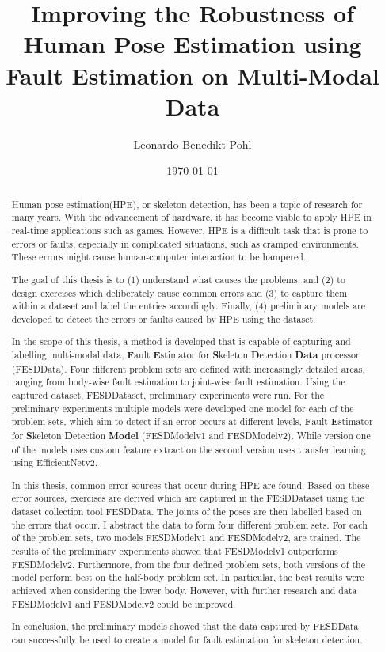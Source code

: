 
\title{Improving the Robustness of Human Pose Estimation using Fault Estimation on Multi-Modal Data}
\author{Leonardo Benedikt Pohl}
\date{\today}
 
\newlength{\originalVOffset}
\newlength{\originalHOffset}
\setlength{\originalVOffset}{\voffset}   
\setlength{\originalHOffset}{\hoffset}

\setlength{\voffset}{0cm}
\setlength{\hoffset}{0cm}

\setlength{\voffset}{\originalVOffset}
\setlength{\hoffset}{\originalHOffset}

\cleardoublepage

\begin{abstract}  
  Human pose estimation(HPE), or skeleton detection, has been a topic of research for many years. With the advancement of hardware, it has become viable to apply HPE in real-time applications such as games. However, HPE is a difficult task that is prone to errors or faults, especially in complicated situations, such as cramped environments. These errors might cause human-computer interaction to be hampered.

  The goal of this thesis is to (1) understand what causes the problems, and (2) to design exercises which deliberately cause common errors and (3) to capture them within a dataset and label the entries accordingly. Finally, (4) preliminary models are developed to detect the errors or faults caused by HPE using the dataset.

  In the scope of this thesis, a method is developed that is capable of capturing and labelling multi-modal data, \textbf{F}ault \textbf{E}stimator for \textbf{S}keleton \textbf{D}etection \textbf{Data} processor (FESDData). Four different problem sets are defined with increasingly detailed areas, ranging from body-wise fault estimation to joint-wise fault estimation. Using the captured dataset, FESDDataset, preliminary experiments were run. For the preliminary experiments multiple models were developed one model for each of the problem sets, which aim to detect if an error occurs at different levels, \textbf{F}ault \textbf{E}stimator for \textbf{S}keleton \textbf{D}etection \textbf{Model} (FESDModelv1 and FESDModelv2). While version one of the models uses custom feature extraction the second version uses transfer learning using EfficientNetv2.

  In this thesis, common error sources that occur during HPE are found. Based on these error sources, exercises are derived which are captured in the FESDDataset using the dataset collection tool FESDData. The joints of the poses are then labelled based on the errors that occur. I abstract the data to form four different problem sets. For each of the problem sets, two models FESDModelv1 and FESDModelv2, are trained. The results of the preliminary experiments showed that FESDModelv1 outperforms FESDModelv2. Furthermore, from the four defined problem sets, both versions of the model perform best on the half-body problem set. In particular, the best results were achieved when considering the lower body. However, with further research and data FESDModelv1 and FESDModelv2 could be improved.

In conclusion, the preliminary models showed that the data captured by FESDData can successfully be used to create a model for fault estimation for skeleton detection.

\end{abstract}
